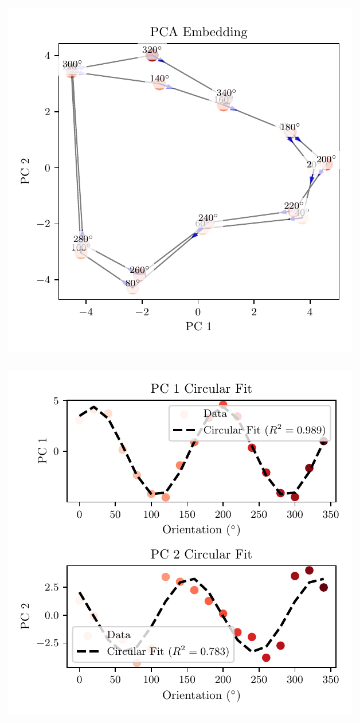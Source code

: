\documentclass[11pt,a4paper]{article}
\begin{document}
\begin{figure}
    \centering
    \begin{subfigure}[b]{0.48\textwidth}
        \centering
        \includegraphics[width=\textwidth]{results/mouse_circular_colormap_visualization.pdf}
        \label{fig:mouse_colormap}
    \end{subfigure}
    \hfill
    \begin{subfigure}[b]{0.48\textwidth}
        \centering
        \includegraphics[width=\textwidth]{results/mouse_circular_regression.pdf}

\end{subfigure}
\end{figure}
\end{document}
